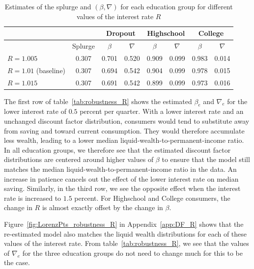 \documentclass[\econtexRoot/HAFiscal]{subfiles}
\begin{document}
\begin{table}[t]
  \begin{center}
    \begin{tabular}{lc|cccccc} 
      \toprule
      & & \multicolumn{2}{c}{Dropout} & \multicolumn{2}{c}{Highschool} & \multicolumn{2}{c}{College} \\ \midrule 
      & Splurge & $\beta$ & $\nabla$ & $\beta$ & $\nabla$ & $\beta$ & $\nabla$ \\ \midrule 
      $R = 1.005$ & 0.307 & 0.701 & 0.520 & 0.909 & 0.099 & 0.983 & 0.014 \\
      $R = 1.01$ (baseline) & 0.307 & 0.694 & 0.542 & 0.904 & 0.099 & 0.978 & 0.015 \\ 
      $R = 1.015$ & 0.307 & 0.691 & 0.542 & 0.899 & 0.099 & 0.973 & 0.016 
      \\ \bottomrule 
    \end{tabular}
    \caption{Estimates of the splurge and $(\beta,\nabla)$ for each education group for different values of the interest rate $R$}
    \notinsubfile{\label{tab:robustness_R}}
  \end{center}
\end{table}

The first row of table~\ref{tab:robustness_R} shows the estimated $\beta_e$ and $\nabla_e$ for the lower interest rate of $0.5$ percent per quarter. With a lower interest rate and an unchanged discount factor distribution, consumers would tend to substitute away from saving and toward current consumption. They would therefore accumulate less wealth, leading to a lower median liquid-wealth-to-permanent-income ratio. In all education groups, we therefore see that the estimated discount factor distributions are centered around higher values of $\beta$ to ensure that the model still matches the median liquid-wealth-to-permanent-income ratio in the data. An increase in patience cancels out the effect of the lower interest rate on median saving. Similarly, in the third row, we see the opposite effect when the interest rate is increased to $1.5$ percent. For Highschool and College consumers, the change in $R$ is almost exactly offset by the change in $\beta$.  

Figure~\ref{fig:LorenzPts_robustness_R} in Appendix~\ref{app:DF_R} shows that the re-estimated model also matches the liquid wealth distributions for each of these values of the interest rate. From table~\ref{tab:robustness_R}, we see that the values of $\nabla_e$ for the three education groups do not need to change much for this to be the case. 
\end{document}

